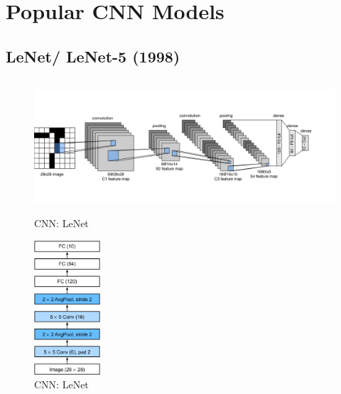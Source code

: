 \chapter{Popular CNN Models}

\section{LeNet/ LeNet-5 (1998) \cite{gfg-convolutional-neural-network-cnn-in-machine-learning,wiki-lenet,ieee/726791/cnn-lenet,medium/lenet-5-complete-architecture-84c6d08215f9,dnn-1}} \label{cnn: LeNet}

\begin{table}[H]
    \begin{minipage}{0.7\linewidth}
        \begin{figure}[H]
            \centering
            \includegraphics[width=\linewidth, height=5cm, keepaspectratio]{Pictures/convolutional-neural-network/lenet.jpg}
            \caption*{CNN: LeNet \cite{dnn-1}}
        \end{figure}
    \end{minipage}
    \hfill
    \begin{minipage}{0.3\linewidth}
        \begin{figure}[H]
            \centering
            \includegraphics[width=\linewidth, height=5cm, keepaspectratio]{Pictures/convolutional-neural-network/lenet-vert.jpg}
            \caption*{CNN: LeNet \cite{dnn-1}}
        \end{figure}
    \end{minipage}
\end{table}

